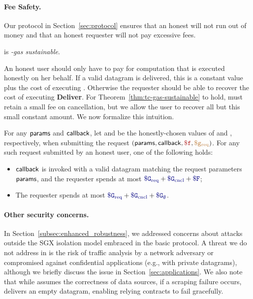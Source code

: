 \vspace{-1ex}
\paragraph{Fee Safety.}
Our protocol in Section~\ref{sec:protocol} ensures that an honest \tcs will not run out of money
and that an honest requester will not pay excessive fees.

\begin{theorem}
\label{thm:tc-gas-sustainable}
\tcs is \emph{\constgasmax-gas sustainable}.
\end{theorem}

An honest user should only have to pay for computation that is executed honestly on her behalf.
If a valid datagram is delivered, this is a constant value plus the cost of executing \dgcallback.
Otherwise the requester should be able to recover the cost of executing {\bf Deliver}.
For Theorem~\ref{thm:tc-gas-sustainable} to hold, \tcont must retain a small fee on cancellation,
but we allow the user to recover all but this small constant amount.
We now formalize this intuition.

\begin{theorem}
\label{thm:fair-expenditure}
For any ${\sf params}$ and ${\sf callback}$,
let \constgasrequest and \consthonestfee be the honestly-chosen values of \gasrequest and \fee, respectively,
when submitting the request $(\dgform, \dgcallback, \fee, \gasrequest)$.
For any such request submitted by an honest user, one of the following holds:
\begin{itemize}
  \setlength{\itemsep}{2pt}
  \setlength{\parskip}{0pt}
  \setlength{\parsep}{0pt}
  \item ${\sf callback}$ is invoked with a valid datagram matching the request parameters ${\sf params}$,
    and the requester spends at most $\constgasrequest + \constgasinvokecancel + \consthonestfee$;

  \item The requester spends at most $\constgasrequest + \constgasinvokecancel + \constgascancel$.
\end{itemize}
\end{theorem}





\vspace{-1ex}
\paragraph{Other security concerns.} In Section~\ref{subsec:enhanced_robustness}, we addressed concerns about attacks outside the SGX isolation model embraced in the basic \tc protocol. A threat we do not address in \tc is the risk of traffic analysis by a network adversary or compromised \medname against confidential applications (e.g., with private datagrams), although we briefly discuss the issue in Section~\ref{sec:applications}. We also note that while \tc assumes the correctness of data sources, if a scraping failure occurs, \tc delivers an empty datagram, enabling relying contracts to fail gracefully.

